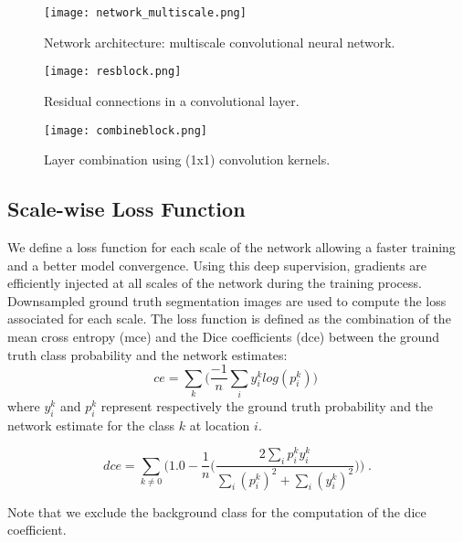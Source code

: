 \documentclass[11pt]{article}
\begin{document}
\begin{figure}[httb]
    \centering
    \texttt{[image: network\_multiscale.png]}
    \caption{Network architecture: multiscale convolutional neural network.}
    \label{archi}
\end{figure}

\begin{figure}[httb]
    \centering
    \texttt{[image: resblock.png]}
    \caption{Residual connections in a convolutional layer.}
    \label{residual}
\end{figure}

\begin{figure}[httb]
    \centering
    \texttt{[image: combineblock.png]}
    \caption{Layer combination using (1x1) convolution kernels.}
    \label{combination}
\end{figure}


\subsection{Scale-wise Loss Function}

We define a loss function for each scale of the network allowing a faster training and a better model convergence. Using this deep supervision, gradients are efficiently injected at all scales of the network during the training process. Downsampled ground truth segmentation images are used to compute the loss associated for each scale. The loss function is defined as the combination of the mean cross entropy (mce) and the Dice coefficients (dce) between the ground truth class probability and the network estimates:
\begin{equation}
ce = \sum_k \Big( \frac{-1}{n} \sum_i y_i^k log(p_i^k) \Big) \;
\end{equation}
where $y_i^k$ and $p_i^k$ represent respectively the ground truth probability and the network estimate for the class $k$ at location $i$.

\begin{equation}
dce = \sum_{k \neq 0}  \Big( 1.0 - \frac{1}{n} \Big( \frac{ 2 \sum_i p_i^k y_i^k }{ \sum_i (p_i^k)^2 + \sum_i (y_i^k)^2  } \Big) \Big) \; .
\end{equation}

Note that we exclude the background class for the computation of the dice coefficient.

\end{document}
